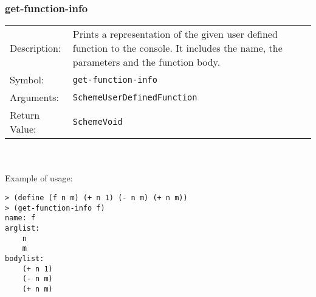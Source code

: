 \documentclass[12pt,a4paper]{scrartcl}
\begin{document}
\subsubsection*{get-function-info}
\begin{tabular}{l p{13cm}}
Description: & Prints a representation of the given user defined function to the console. It includes the name, the parameters and the function body.\\
Symbol: & \lstinline{get-function-info}\\
Arguments: & \lstinline{SchemeUserDefinedFunction}\\
Return Value: & \lstinline{SchemeVoid}
\end{tabular}
\\
\\
Example of usage:
\begin{lstlisting}
> (define (f n m) (+ n 1) (- n m) (+ n m))
> (get-function-info f)
name: f
arglist:
	n
	m
bodylist:
	(+ n 1)
	(- n m)
	(+ n m)
\end{lstlisting}
\end{document}
